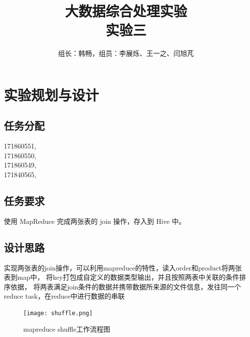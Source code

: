 \documentclass[a4paper,UTF8]{article}
\author{组长：韩畅，组员：李展烁、王一之、闫旭芃}
\numberwithin{equation}{section}
\begin{document}
{}
\title{大数据综合处理实验\\
实验三}
\maketitle

\section{实验规划与设计}
\subsection{任务分配}
{171860551, }\\ \indent
{171860550, }\\ \indent
{171860549, }\\ \indent
{171840565, }
\subsection{任务要求}
使用 MapReduce 完成两张表的 join 操作，存入到 Hive 中。
\subsection{设计思路}
实现两张表的join操作，可以利用mapreduce的特性，读入order和product将两张表到map中，
将key打包成自定义的数据类型输出，并且按照两表中关联的条件排序依据，
将两表满足join条件的数据并携带数据所来源的文件信息，发往同一个reduce task，在reduce中进行数据的串联
\begin{figure}[H]
    \centering

    \texttt{[image: shuffle.png]}

    \caption{mapreduce shuffle工作流程图}
\end{figure}
\end{document}
